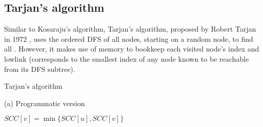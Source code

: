\subsection{Tarjan's algorithm} \label{algorithm-scc-tarjan}
Similar to Kosaraju's algorithm, Tarjan's algorithm, proposed by Robert Tarjan in 1972 \cite{tarjan72}, uses the ordered DFS of all nodes, starting on a random node, to find all . However, it makes use of memory to bookkeep each visited node's index and lowlink (corresponds to the smallest index of any node known to be reachable from its DFS subtree). 
\begin{center}
    \begin{algorithm}[H]
        \caption{Tarjan's algorithm}
        \label{alg-tarjan}
        \begin{minipage}[t]{0.80\linewidth}
            (a) Programmatic version
            \begin{algorithmic}[1]


                         {}
                        \EndIf
                         {$SCC[v] = \min \{SCC[u], SCC[v]\}$}
                        \EndIf
                    \EndFor

                        \EndWhile
                    \EndIf
                \EndFunction

                    \EndFor
                        \EndIf
                    \EndFor
                    \State {}
                \EndFunction
            \end{algorithmic}
        \end{minipage}
    \end{algorithm}
\end{center}
